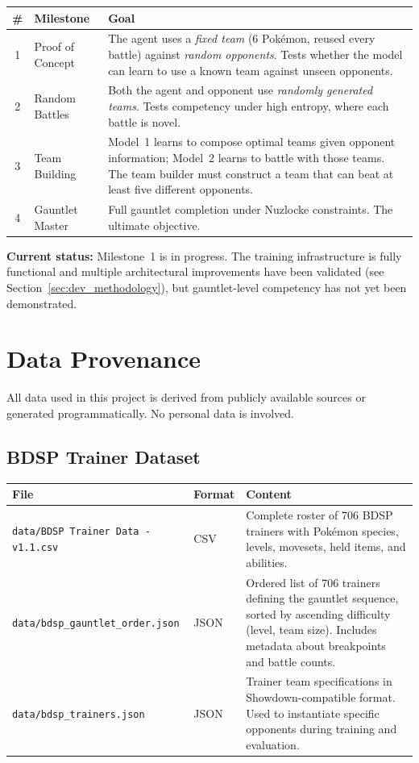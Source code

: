 \begin{center}
\small
\begin{tabularx}{\textwidth}{c l X}
  \toprule
  \textbf{\#} & \textbf{Milestone} & \textbf{Goal} \\
  \midrule
  1 & Proof of Concept &
    The agent uses a \emph{fixed team} (6 Pok\'{e}mon, reused every battle)
    against \emph{random opponents}.  Tests whether the model can learn to
    use a known team against unseen opponents. \\
  2 & Random Battles &
    Both the agent and opponent use \emph{randomly generated teams}.  Tests
    competency under high entropy, where each battle is novel. \\
  3 & Team Building &
    Model~1 learns to compose optimal teams given opponent information;
    Model~2 learns to battle with those teams.  The team builder must
    construct a team that can beat at least five different opponents. \\
  4 & Gauntlet Master &
    Full gauntlet completion under Nuzlocke constraints.  The ultimate
    objective. \\
  \bottomrule
\end{tabularx}
\end{center}

\textbf{Current status:} Milestone~1 is in progress.  The training
infrastructure is fully functional and multiple architectural improvements have
been validated (see Section~\ref{sec:dev_methodology}), but gauntlet-level
competency has not yet been demonstrated.

\section{Data Provenance}

All data used in this project is derived from publicly available sources or
generated programmatically.  No personal data is involved.

\subsection{BDSP Trainer Dataset}

\begin{center}
\small
\begin{tabularx}{\textwidth}{l l X}
  \toprule
  \textbf{File} & \textbf{Format} & \textbf{Content} \\
  \midrule
  \texttt{data/BDSP Trainer Data - v1.1.csv} & CSV &
    Complete roster of 706 BDSP trainers with Pok\'{e}mon species, levels,
    movesets, held items, and abilities. \\
  \texttt{data/bdsp\_gauntlet\_order.json} & JSON &
    Ordered list of 706 trainers defining the gauntlet sequence, sorted by
    ascending difficulty (level, team size).  Includes metadata about
    breakpoints and battle counts. \\
  \texttt{data/bdsp\_trainers.json} & JSON &
    Trainer team specifications in Showdown-compatible format.  Used to
    instantiate specific opponents during training and evaluation. \\
  \bottomrule
\end{tabularx}
\end{center}

